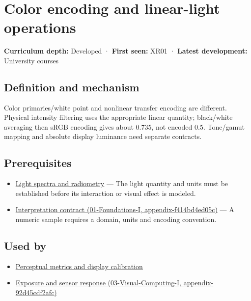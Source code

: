 \hypertarget{appendix-a9f83ad40792}{}
\section{Color encoding and linear-light operations}\label{appendix-a9f83ad40792-color-encoding-and-linear-light-operations}

\textbf{Curriculum depth:} Developed · \textbf{First seen:} XR01 · \textbf{Latest development:} University courses

\subsection{Definition and mechanism}\label{appendix-a9f83ad40792-definition-and-mechanism}

Color primaries/white point and nonlinear transfer encoding are different. Physical intensity filtering uses the appropriate linear quantity; black/white averaging then sRGB encoding gives about 0.735, not encoded 0.5. Tone/gamut mapping and absolute display luminance need separate contracts.

\subsection{Prerequisites}\label{appendix-a9f83ad40792-prerequisites}

\begin{itemize}
\tightlist
\item
  \hyperref[appendix-215c2570199b]{Light spectra and radiometry} --- The light quantity and units must be established before its interaction or visual effect is modeled.
\item
  \href{../01-Foundations-I/main.pdf\#nameddest=appendix-f414bd4ed05c}{Interpretation contract (01-Foundations-I, appendix-f414bd4ed05c)} --- A numeric sample requires a domain, units and encoding convention.
\end{itemize}

\subsection{Used by}\label{appendix-a9f83ad40792-used-by}

\begin{itemize}
\tightlist
\item
  \hyperref[appendix-b2c1846508bf]{Perceptual metrics and display calibration}
\item
  \href{../03-Visual-Computing-I/main.pdf\#nameddest=appendix-92d45cdf2afc}{Exposure and sensor response (03-Visual-Computing-I, appendix-92d45cdf2afc)}
\end{itemize}

